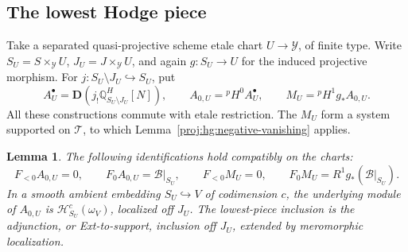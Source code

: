 \documentclass[11pt,letterpaper]{article}
\newcommand{\Q}{\mathbb{Q}}
\newtheorem{lemma}[theorem]{Lemma}
\theoremstyle{definition}
\theoremstyle{remark}
\begin{document}
\subsection{The lowest Hodge piece}

Take a separated quasi-projective scheme etale chart
\(U\to\mathcal Y\), of finite type.  Write
\(S_U=S\times_{\mathcal Y}U\), \(J_U=J\times_{\mathcal Y}U\),
and again \(g:S_U\to U\) for the induced projective morphism.
For \(j:S_U\setminus J_U\hookrightarrow S_U\), put
\[
 A^\bullet_U=\mathbf D\!\left(
             j_!\Q^H_{S_U\setminus J_U}[N]\right),
 \qquad
 A_{0,U}={}^{p}\!H^0A^\bullet_U,
 \qquad
 M_U={}^{p}\!H^1g_*A_{0,U}.
\]
All these constructions commute with etale restriction.  The \(M_U\)
form a system supported on \(\mathcal T\), to which
Lemma~\ref{proj:hg:negative-vanishing} applies.

\begin{lemma}\label{proj:hg:lowest-piece}
The following identifications hold compatibly on the charts:
\[
 F_{<0}A_{0,U}=0,\qquad F_0A_{0,U}=\mathcal B|_{S_U},
 \qquad
 F_{<0}M_U=0,\qquad
 F_0M_U=R^1g_*(\mathcal B|_{S_U}).
\]
In a smooth ambient embedding \(S_U\hookrightarrow V\) of
codimension \(c\), the underlying module of \(A_{0,U}\) is
\(\mathcal H^c_{S_U}(\omega_V)\), localized off \(J_U\).
The lowest-piece inclusion is the adjunction, or Ext-to-support,
inclusion off \(J_U\), extended by meromorphic localization.
\end{lemma}
\end{document}
